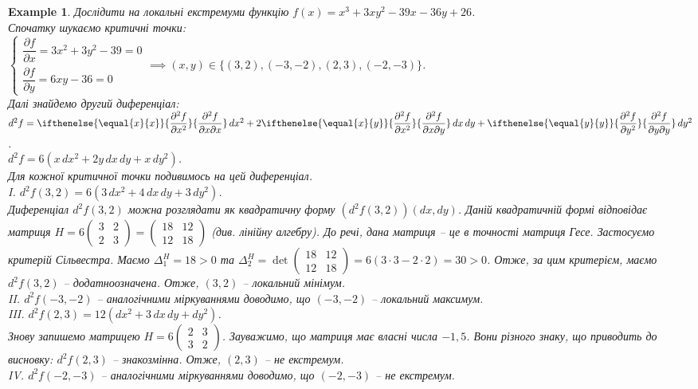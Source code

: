 \documentclass[a4paper, 10pt]{article}
\def\departial#1#2{\dfrac{\partial {#1}}{\partial {#2}}}
\def\seconddepartial#1#2#3{\ifthenelse{\equal{#2}{#3}}{\dfrac{\partial^2 {#1}}{\partial {#2}^2}}{\dfrac{\partial^2 {#1}}{\partial {#2} \partial {#3}}}}
\theoremstyle{theoremdd}
\theoremstyle{theoremdd}
\theoremstyle{theoremdd}
\theoremstyle{theoremdd}
\theoremstyle{theoremdd}
\newtheorem{example}[theorem]{Example}
\theoremstyle{theoremdd}
\theoremstyle{theoremdd}
\theoremstyle{theoremdd}
\theoremstyle{theoremdd}
\begin{document}
\begin{example}
Дослідити на локальні екстремуми функцію $f(x) = x^3+3xy^2-39x-36y+26$.\\
Спочатку шукаємо критичні точки:\\
$\begin{cases} \departial{f}{x} = 3x^2+3y^2-39 = 0 \\ \departial{f}{y} = 6xy-36 = 0 \end{cases} \implies (x,y) \in \{ (3,2), (-3,-2), (2,3), (-2,-3) \}$.\\
Далі знайдемо другий диференціал:\\
$d^2 f = \seconddepartial{f}{x}{x}\,dx^2 + 2\seconddepartial{f}{x}{y}\,dx\,dy + \seconddepartial{f}{y}{y}\,dy^2$.\\
$d^2 f = 6 (x \,dx^2 + 2y\,dx\,dy + x\,dy^2)$.\\
Для кожної критичної точки подивимось на цей диференціал.\\
I. $d^2 f(3,2) = 6(3\,dx^2 + 4\,dx\,dy + 3\,dy^2)$.\\
Диференціал $d^2 f(3,2)$ можна розглядати як квадратичну форму $(d^2 f(3,2))(dx,dy)$. Даній квадратичній формі відповідає матриця $H = 6\begin{pmatrix} 3 & 2 \\ 2 & 3 \end{pmatrix} = \begin{pmatrix}
18 & 12 \\
12 & 18
\end{pmatrix}$ (див. лінійну алгебру). До речі, дана матриця -- це в точності матриця Гесе. Застосуємо критерій Сільвестра. Маємо $\Delta^H_1 = 18 > 0$ та $\Delta^H_2 = \det \begin{pmatrix}
18 & 12 \\
12 & 18
\end{pmatrix} = 6 (3 \cdot 3 - 2 \cdot 2) = 30 > 0$. Отже, за цим критерієм, маємо $d^2f(3,2)$ -- додатноозначена. Отже, $(3,2)$ -- локальний мінімум.
\bigskip \\
II. $d^2f(-3,-2)$ -- аналогічними міркуваннями доводимо, що $(-3,-2)$ -- локальний максимум.
\bigskip \\
III. $d^2f(2,3) = 12(dx^2 + 3\,dx\,dy + dy^2)$.\\
Знову запишемо матрицею $H = 6\begin{pmatrix}
2 & 3 \\
3 & 2
\end{pmatrix}$. Зауважимо, що матриця має власні числа $-1,5$. Вони різного знаку, що приводить до висновку: $d^2f(2,3)$ -- знакозмінна. Отже, $(2,3)$ -- не екстремум.
\bigskip \\
IV. $d^2f(-2,-3)$ -- аналогічними міркуваннями доводимо, що $(-2,-3)$ -- не екстремум.
\end{example}
\end{document}
